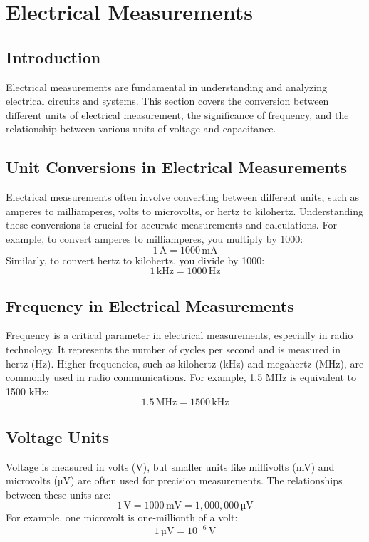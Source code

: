 \section{Electrical Measurements}
\label{section:electrical_measurements}

\subsection*{Introduction}
Electrical measurements are fundamental in understanding and analyzing electrical circuits and systems. This section covers the conversion between different units of electrical measurement, the significance of frequency, and the relationship between various units of voltage and capacitance.

\subsection*{Unit Conversions in Electrical Measurements}
Electrical measurements often involve converting between different units, such as amperes to milliamperes, volts to microvolts, or hertz to kilohertz. Understanding these conversions is crucial for accurate measurements and calculations. For example, to convert amperes to milliamperes, you multiply by 1000:
\begin{equation}
1 \, \text{A} = 1000 \, \text{mA}
\end{equation}
Similarly, to convert hertz to kilohertz, you divide by 1000:
\begin{equation}
1 \, \text{kHz} = 1000 \, \text{Hz}
\end{equation}

\subsection*{Frequency in Electrical Measurements}
Frequency is a critical parameter in electrical measurements, especially in radio technology. It represents the number of cycles per second and is measured in hertz (Hz). Higher frequencies, such as kilohertz (kHz) and megahertz (MHz), are commonly used in radio communications. For example, 1.5 MHz is equivalent to 1500 kHz:
\begin{equation}
1.5 \, \text{MHz} = 1500 \, \text{kHz}
\end{equation}

\subsection*{Voltage Units}
Voltage is measured in volts (V), but smaller units like millivolts (mV) and microvolts (µV) are often used for precision measurements. The relationships between these units are:
\begin{equation}
1 \, \text{V} = 1000 \, \text{mV} = 1,000,000 \, \text{µV}
\end{equation}
For example, one microvolt is one-millionth of a volt:
\begin{equation}
1 \, \text{µV} = 10^{-6} \, \text{V}
\end{equation}

